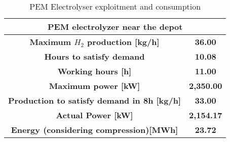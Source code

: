 \begin{table}[h]
\centering
\begin{tabular}{|c|c|}
\hline
\multicolumn{2}{|c|}{\cellcolor{bluepoli!40}\textbf{PEM electrolyzer near the depot}}                               \\ \hline
\multicolumn{1}{|c|}{\textbf{Maximum $H_2$ production {[}kg/h{]}}}       & \textbf{36.00}    \\ \hline
\multicolumn{1}{|c|}{\textbf{Hours to satisfy demand}}                   & \textbf{10.08}    \\ \hline
\multicolumn{1}{|c|}{\textbf{Working hours {[}h{]}}}                     & \textbf{11.00}    \\ \hline
\multicolumn{1}{|c|}{\textbf{Maximum power {[}kW{]}}}                    & \textbf{2,350.00} \\ \hline
\multicolumn{1}{|c|}{\textbf{Production to satisfy demand in 8h {[}kg/h{]}}} & \textbf{33.00}    \\ \hline
\multicolumn{1}{|c|}{\textbf{Actual Power {[}kW{]}}}                     & \textbf{2,154.17} \\ \hline
\multicolumn{1}{|c|}{\textbf{Energy (considering compression){[}MWh{]}}} & \textbf{23.72}    \\ \hline
\end{tabular}
\caption{PEM Electrolyser exploitment and consumption}
\label{tab:crodotech}
\end{table}